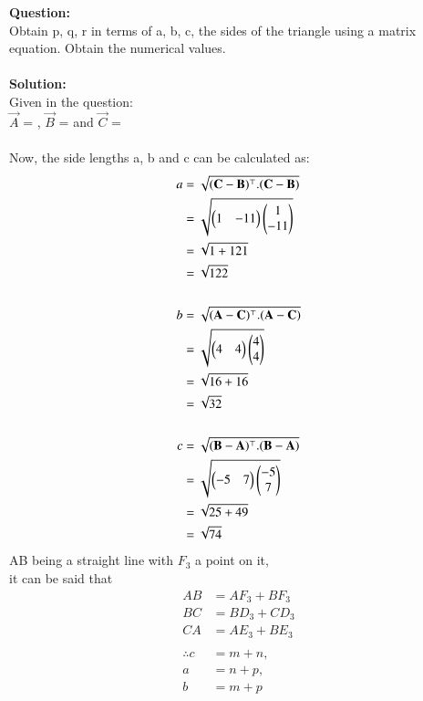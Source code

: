 \documentclass[journal,12pt,twocolumn]{IEEEtran}
\theoremstyle{remark}
\begin{document}
%
\textbf{Question:}\\
Obtain p, q, r in terms of a, b, c, the sides of the triangle using a matrix
equation. Obtain the numerical values.\\\\
\indent\textbf{Solution:}\\
Given in the question:\\ 
$\vec{A}$ = ,
$\vec{B}$ = 
and $\vec{C}$ =  \\\\
Now, the side lengths a, b and c can be calculated as:
\begin{align}
    a &= \sqrt{(\vec{C}-\vec{B})^{\top}.(\vec{C}-\vec{B})}\\
    &= \sqrt{\myvec{1&-11} \myvec{1\\-11}}\\
    &= \sqrt{1+121}\\
    &=\sqrt{122}\\\\
% 
    b &= \sqrt{(\vec{A}-\vec{C})^{\top}.(\vec{A}-\vec{C})}\\
    &= \sqrt{\myvec{4&4} \myvec{4\\4}}\\
    &= \sqrt{16+16}\\
    &=\sqrt{32}\\\\
% 
    c &= \sqrt{(\vec{B}-\vec{A})^{\top}.(\vec{B}-\vec{A})}\\
    &= \sqrt{\myvec{-5&7} \myvec{-5\\7}}\\
    &= \sqrt{25+49}\\
    &=\sqrt{74}
\end{align}
AB being a straight line with $F_3$ a point on it,\\ it can be said that
\begin{align}
    AB &= AF_3 + BF_3\\
    BC &= BD_3 + CD_3\\
    CA &= AE_3 + BE_3\\\\
% 
    \therefore 
    c &= m+n,\\
    a &= n+p, \\
    b &= m+p 
\end{align}
\end{document}
